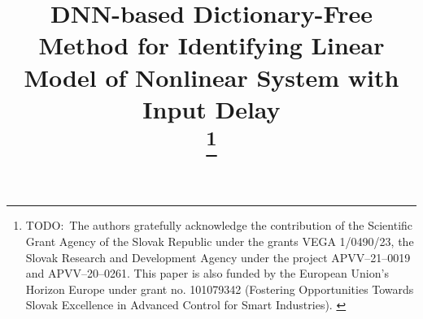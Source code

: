 \documentclass[conference]{IEEEtran}
\newcommand{\todo}[1]{{{\color{red} TODO:~#1	}} }
\begin{document}
\title{DNN-based Dictionary-Free Method for Identifying Linear Model of Nonlinear System with Input Delay\\

    \thanks{\todo{The authors gratefully acknowledge the contribution of the Scientific Grant Agency of the Slovak Republic under the grants VEGA 1/0490/23, the Slovak Research and Development Agency under the project APVV--21--0019 and APVV--20--0261. This paper is also funded by the European Union's Horizon Europe under grant no. 101079342 (Fostering Opportunities Towards Slovak Excellence in Advanced Control for Smart Industries).}}
}

\author{
}

\maketitle
\end{document}

